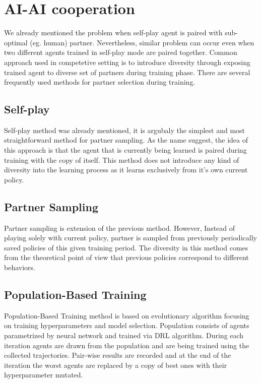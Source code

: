 \section{AI-AI cooperation}\label{aiaicooperation}
We already mentioned the problem when self-play agent is paired with sub-optimal (eg. human) partner.
Nevertheless, similar problem can occur even when two different agents trained in self-play mode are paired together.
Common approach used in competetive setting is to introduce diversity through exposing trained agent to diverse set of partners during training phase.
There are several frequently used methods for partner selection during training.

\subsection{Self-play}\label{selfplayMethod}
Self-play method was already mentioned, it is argubaly the simplest and most straightforward method for partner sampling.
As the name suggest, the idea of this approach is that the agent that is currently being learned is paired during training with the copy of itself.
This method does not introduce any kind of diversity into the learning process as it learns exclusively from it's own current policy.

\subsection{Partner Sampling}
Partner sampling is extension of the previous method. 
However, Instead of playing solely with current policy, partner is sampled from previously periodically saved policies of this given training period.
The diversity in this method comes from the theoretical point of view that previous policies correspond to different behaviors.

\subsection{Population-Based Training}
Population-Based Training method is based on evolutionary algorithm focusing on training hyperparameters and model selection.
Population consists of agents parametrized by neural network and trained via DRL algorithm.
During each iteration agents are drawn from the population and are being trained using the collected trajectories.
Pair-wise results are recorded and at the end of the iteration the worst agents are replaced by a copy of best ones with their hyperparameter mutated.

